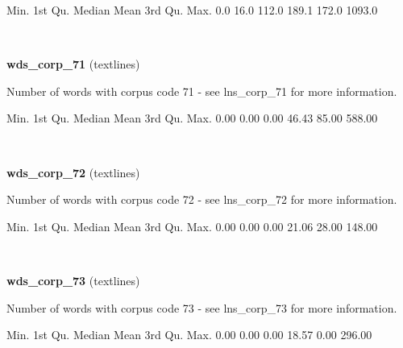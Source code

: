 \documentclass[]{article}
\newenvironment{Shaded}{\begin{snugshade}}{\end{snugshade}}
\newcommand{\FloatTok}[1]{\textcolor[rgb]{0.00,0.00,0.81}{{#1}}}
\newcommand{\NormalTok}[1]{{#1}}
\begin{document}
\begin{Shaded}
\begin{Highlighting}[]
   \NormalTok{Min. 1st Qu.  Median    Mean 3rd Qu.    Max. }
    \FloatTok{0.0}    \FloatTok{16.0}   \FloatTok{112.0}   \FloatTok{189.1}   \FloatTok{172.0}  \FloatTok{1093.0} 
\end{Highlighting}
\end{Shaded}

~

\vspace{1em}

\textbf{wds\_corp\_71} (textlines)

Number of words with corpus code 71 - see lns\_corp\_71 for more
information.

\begin{Shaded}
\begin{Highlighting}[]
   \NormalTok{Min. 1st Qu.  Median    Mean 3rd Qu.    Max. }
   \FloatTok{0.00}    \FloatTok{0.00}    \FloatTok{0.00}   \FloatTok{46.43}   \FloatTok{85.00}  \FloatTok{588.00} 
\end{Highlighting}
\end{Shaded}

~

\vspace{1em}

\textbf{wds\_corp\_72} (textlines)

Number of words with corpus code 72 - see lns\_corp\_72 for more
information.

\begin{Shaded}
\begin{Highlighting}[]
   \NormalTok{Min. 1st Qu.  Median    Mean 3rd Qu.    Max. }
   \FloatTok{0.00}    \FloatTok{0.00}    \FloatTok{0.00}   \FloatTok{21.06}   \FloatTok{28.00}  \FloatTok{148.00} 
\end{Highlighting}
\end{Shaded}

~

\vspace{1em}

\textbf{wds\_corp\_73} (textlines)

Number of words with corpus code 73 - see lns\_corp\_73 for more
information.

\begin{Shaded}
\begin{Highlighting}[]
   \NormalTok{Min. 1st Qu.  Median    Mean 3rd Qu.    Max. }
   \FloatTok{0.00}    \FloatTok{0.00}    \FloatTok{0.00}   \FloatTok{18.57}    \FloatTok{0.00}  \FloatTok{296.00} 
\end{Highlighting}
\end{Shaded}
\end{document}

